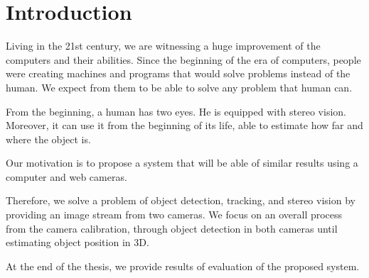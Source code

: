 \chapter*{Introduction}

Living in the 21st century, we are witnessing a huge improvement of the
computers and their abilities. Since the beginning of the era of computers,
people were creating machines and programs that would solve problems instead of
the human. We expect from them to be able to solve any problem that human can.

From the beginning, a human has two eyes. He is equipped with stereo vision.
Moreover, it can use it from the beginning of its life, able to estimate how
far and where the object is.

Our motivation is to propose a system that will be able of similar results
using a computer and web cameras.

Therefore, we solve a problem of object detection, tracking, and stereo
vision by providing an image stream from two cameras. We focus on an overall
process from the camera calibration, through object detection in both cameras
until estimating object position in 3D.

At the end of the thesis, we provide results of evaluation of the proposed system.
